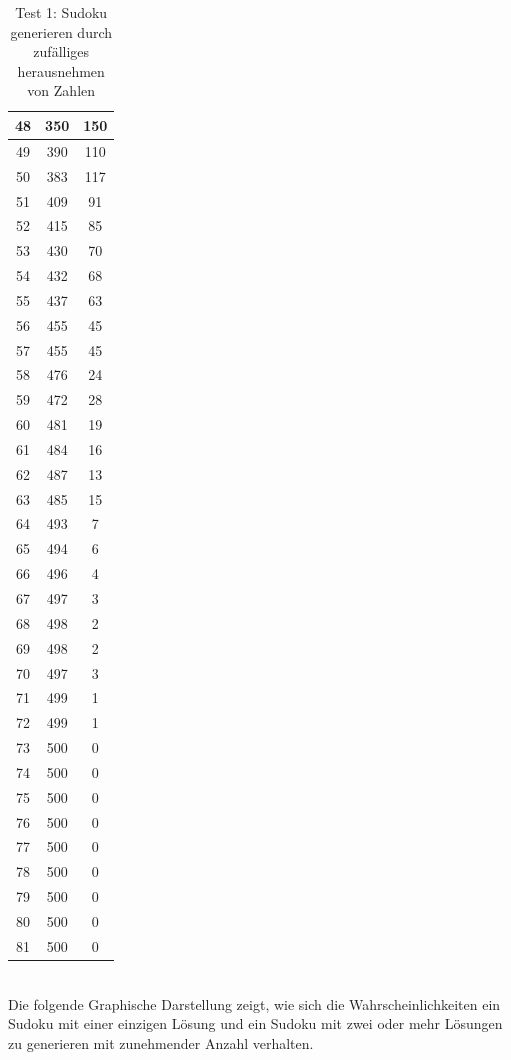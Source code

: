 \documentclass[11pt,a4paper]{article}
\begin{document}
\begin{table}[htbp!]
\begin{center}
\begin{tabular}[htbp!]{|*{3}{c|}}
 48 & 350 & 150 \\ \hline 
 49 & 390 & 110 \\ \hline 
 50 & 383 & 117 \\ \hline 
 51 & 409 & 91 \\ \hline 
 52 & 415 & 85 \\ \hline 
 53 & 430 & 70 \\ \hline 
 54 & 432 & 68 \\ \hline 
 55 & 437 & 63 \\ \hline 
 56 & 455 & 45 \\ \hline 
 57 & 455 & 45 \\ \hline 
 58 & 476 & 24 \\ \hline 
 59 & 472 & 28 \\ \hline 
 60 & 481 & 19 \\ \hline 
 61 & 484 & 16 \\ \hline 
 62 & 487 & 13 \\ \hline 
 63 & 485 & 15 \\ \hline 
 64 & 493 & 7 \\ \hline 
 65 & 494 & 6 \\ \hline 
 66 & 496 & 4 \\ \hline 
 67 & 497 & 3 \\ \hline 
 68 & 498 & 2 \\ \hline 
 69 & 498 & 2 \\ \hline 
 70 & 497 & 3 \\ \hline 
 71 & 499 & 1 \\ \hline 
 72 & 499 & 1 \\ \hline 
 73 & 500 & 0 \\ \hline 
 74 & 500 & 0 \\ \hline 
 75 & 500 & 0 \\ \hline 
 76 & 500 & 0 \\ \hline 
 77 & 500 & 0 \\ \hline 
 78 & 500 & 0 \\ \hline 
 79 & 500 & 0 \\ \hline 
 80 & 500 & 0 \\ \hline 
 81 & 500 & 0 \\ \hline 
 \end{tabular}
 \end{center}
 \caption{Test 1: Sudoku generieren durch zufälliges herausnehmen von Zahlen} 
\end{table} 
\ \\
Die folgende Graphische Darstellung zeigt, wie sich die Wahrscheinlichkeiten ein Sudoku mit einer einzigen Lösung und ein Sudoku mit zwei oder mehr Lösungen zu generieren mit zunehmender Anzahl verhalten.
\end{document}
